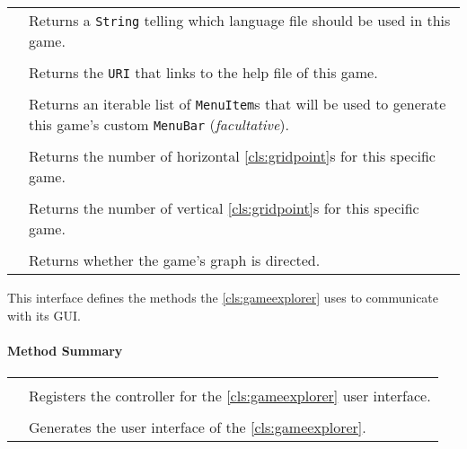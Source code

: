 \begin{longtable}{Lp{10cm}}
	& Returns a \texttt{String} telling which language file should be used in this game. \\
	 \\
	& Returns the \texttt{URI} that links to the help file of this game. \\
	 \\
	& Returns an iterable list of \texttt{MenuItem}s that will be used to generate this game's custom \texttt{MenuBar} (\emph{facultative}). \\
	 \\
	& Returns the number of horizontal \ref{cls:gridpoint}s for this specific game. \\
	 \\
	& Returns the number of vertical \ref{cls:gridpoint}s for this specific game. \\
	 \\
	& Returns whether the game's graph is directed. \\
	\hline
\end{longtable}

\pagebreak

This interface defines the methods the \ref{cls:gameexplorer} uses to communicate with its \gls{GUI}. \\

\centerdash

\paragraph*{Method Summary}
\paragraph*{}
\begin{longtable}{Lp{10cm}}
	\startmethodtable
	 \\
	& Registers the controller for the \ref{cls:gameexplorer} user interface. \\
	 \\
	& Generates the user interface of the \ref{cls:gameexplorer}. \\
	\hline
\end{longtable}

